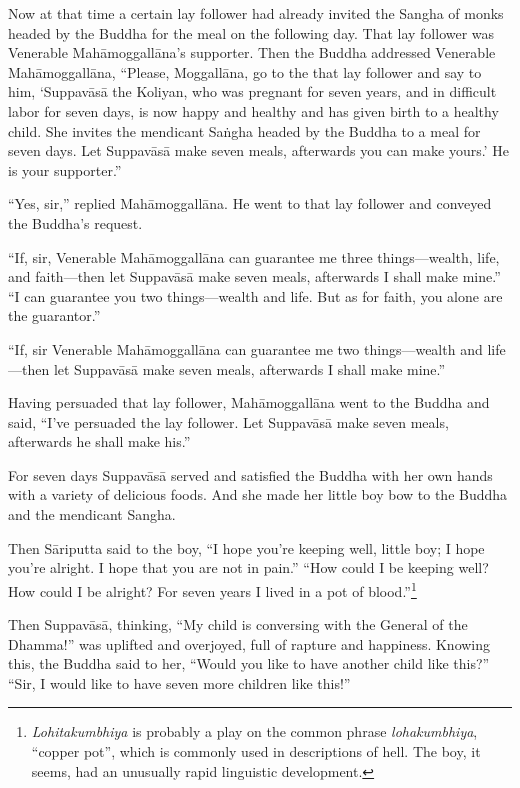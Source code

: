 \documentclass[12pt,openany]{book}%
\begin{document}
Now at that time a certain lay follower had already invited the Sangha of monks headed by the Buddha for the meal on the following day. That lay follower was Venerable \textsanskrit{Mahāmoggallāna}’s supporter. Then the Buddha addressed Venerable \textsanskrit{Mahāmoggallāna}, “Please, \textsanskrit{Moggallāna}, go to the that lay follower and say to him, ‘\textsanskrit{Suppavāsā} the Koliyan, who was pregnant for seven years, and in difficult labor for seven days, is now happy and healthy and has given birth to a healthy child. She invites the mendicant \textsanskrit{Saṅgha} headed by the Buddha to a meal for seven days. Let \textsanskrit{Suppavāsā} make seven meals, afterwards you can make yours.’ He is your supporter.” 

“Yes, sir,” replied \textsanskrit{Mahāmoggallāna}. He went to that lay follower and conveyed the Buddha’s request. 

“If, sir, Venerable \textsanskrit{Mahāmoggallāna} can guarantee me three things—wealth, life, and faith—then let \textsanskrit{Suppavāsā} make seven meals, afterwards I shall make mine.” “I can guarantee you two things—wealth and life. But as for faith, you alone are the guarantor.” 

“If, sir Venerable \textsanskrit{Mahāmoggallāna} can guarantee me two things—wealth and life—then let \textsanskrit{Suppavāsā} make seven meals, afterwards I shall make mine.” 

Having persuaded that lay follower, \textsanskrit{Mahāmoggallāna} went to the Buddha and said, “I’ve persuaded the lay follower. Let \textsanskrit{Suppavāsā} make seven meals, afterwards he shall make his.” 

For seven days \textsanskrit{Suppavāsā} served and satisfied the Buddha with her own hands with a variety of delicious foods. And she made her little boy bow to the Buddha and the mendicant Sangha. 

Then \textsanskrit{Sāriputta} said to the boy, “I hope you’re keeping well, little boy; I hope you’re alright. I hope that you are not in pain.” “How could I be keeping well? How could I be alright? For seven years I lived in a pot of blood.”\footnote{\textit{Lohitakumbhiya} is probably a play on the common phrase \textit{lohakumbhiya}, “copper pot”, which is commonly used in descriptions of hell. The boy, it seems, had an unusually rapid linguistic development. } 

Then \textsanskrit{Suppavāsā}, thinking, “My child is conversing with the General of the Dhamma!” was uplifted and overjoyed, full of rapture and happiness. Knowing this, the Buddha said to her, “Would you like to have another child like this?” “Sir, I would like to have seven more children like this!” 
\end{document}
